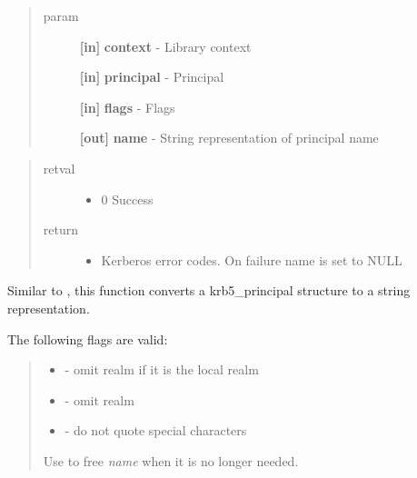 \documentclass[letterpaper,10pt,english]{sphinxmanual}
\begin{document}
\begin{quote}\begin{description}
\item[{param}] \leavevmode
\textbf{{[}in{]}} \textbf{context} - Library context

\textbf{{[}in{]}} \textbf{principal} - Principal

\textbf{{[}in{]}} \textbf{flags} - Flags

\textbf{{[}out{]}} \textbf{name} - String representation of principal name

\end{description}\end{quote}
\begin{quote}\begin{description}
\item[{retval}] \leavevmode\begin{itemize}
\item {} 
0   Success

\end{itemize}

\item[{return}] \leavevmode\begin{itemize}
\item {} 
Kerberos error codes. On failure name is set to NULL

\end{itemize}

\end{description}\end{quote}

Similar to {\hyperref[appdev/refs/api/krb5_unparse_name:c.krb5_unparse_name]{}} , this function converts a krb5\_principal structure to a string representation.

The following flags are valid:
\begin{quote}
\begin{itemize}
\item {} 
{\hyperref[appdev/refs/macros/KRB5_PRINCIPAL_UNPARSE_SHORT:KRB5_PRINCIPAL_UNPARSE_SHORT]{}} - omit realm if it is the local realm

\item {} 
{\hyperref[appdev/refs/macros/KRB5_PRINCIPAL_UNPARSE_NO_REALM:KRB5_PRINCIPAL_UNPARSE_NO_REALM]{}} - omit realm

\item {} 
{\hyperref[appdev/refs/macros/KRB5_PRINCIPAL_UNPARSE_DISPLAY:KRB5_PRINCIPAL_UNPARSE_DISPLAY]{}} - do not quote special characters

\end{itemize}

Use {\hyperref[appdev/refs/api/krb5_free_unparsed_name:c.krb5_free_unparsed_name]{}} to free \emph{name} when it is no longer needed.
\end{quote}
\end{document}
